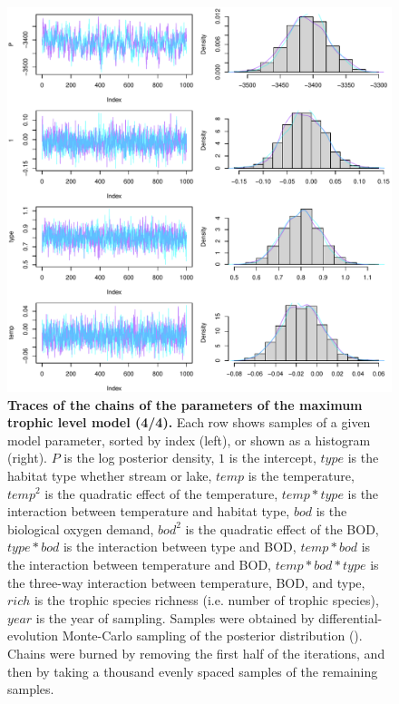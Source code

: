 \documentclass[11pt, oneside]{article}
\begin{document}
\begin{figure}[H]
\begin{center}
\includegraphics[page=4, width=1\linewidth]{b0_6_2/out_mTL/fig_tracePlot_beta.pdf}
\caption{
    \textbf{Traces of the chains of the parameters of the maximum trophic level model (4/4).}
    Each row shows samples of a given model parameter, sorted by index (left), or shown as a histogram (right).
    $P$ is the log posterior density, $1$ is the intercept, $type$ is the habitat type whether stream or lake, $temp$ is the temperature, $temp^2$ is the quadratic effect of the temperature, $temp * type$ is the interaction between temperature and habitat type, $bod$ is the biological oxygen demand, $bod^2$ is the quadratic effect of the BOD, $type * bod$ is the interaction between type and BOD, $temp * bod$ is the interaction between temperature and BOD, $temp * bod * type$ is the three-way interaction between temperature, BOD, and type, $rich$ is the trophic species richness (i.e. number of trophic species), $year$ is the year of sampling.
    Samples were obtained by differential-evolution Monte-Carlo sampling of the posterior distribution (\cite{TerBraak2006}).
    Chains were burned by removing the first half of the iterations, and then by taking a thousand evenly spaced samples of the remaining samples.
} 
\end{center}
\end{figure}
\end{document}

